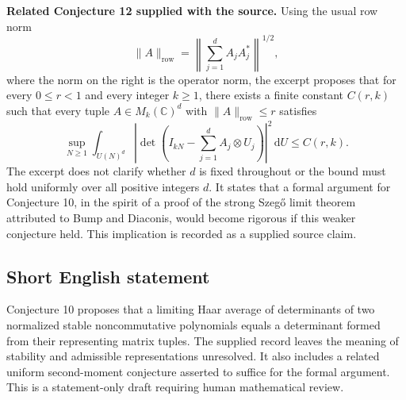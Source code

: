 \documentclass[11pt]{article}
\newcommand{\C}{\mathbb{C}}
\begin{document}
\textbf{Related Conjecture 12 supplied with the source.} Using the usual row norm
\[
 \|A\|_{\mathrm{row}}
 =\left\|\sum_{j=1}^d A_jA_j^*\right\|^{1/2},
\]
where the norm on the right is the operator norm, the excerpt proposes that for every \(0\leq r<1\) and every integer \(k\geq1\), there exists a finite constant \(C(r,k)\) such that every tuple \(A\in M_k(\C)^d\) with \(\|A\|_{\mathrm{row}}\leq r\) satisfies
\[
 \sup_{N\geq1}\int_{U(N)^d}
 \left|\det\!\left(I_{kN}-\sum_{j=1}^d A_j\otimes U_j\right)\right|^2
 \,\mathrm dU
 \leq C(r,k).
\]
The excerpt does not clarify whether \(d\) is fixed throughout or the bound must hold uniformly over all positive integers \(d\). It states that a formal argument for Conjecture 10, in the spirit of a proof of the strong Szeg\H{o} limit theorem attributed to Bump and Diaconis, would become rigorous if this weaker conjecture held. This implication is recorded as a supplied source claim.
\subsection{Short English statement}
Conjecture 10 proposes that a limiting Haar average of determinants of two normalized stable noncommutative polynomials equals a determinant formed from their representing matrix tuples. The supplied record leaves the meaning of stability and admissible representations unresolved. It also includes a related uniform second-moment conjecture asserted to suffice for the formal argument. This is a statement-only draft requiring human mathematical review.
\end{document}
